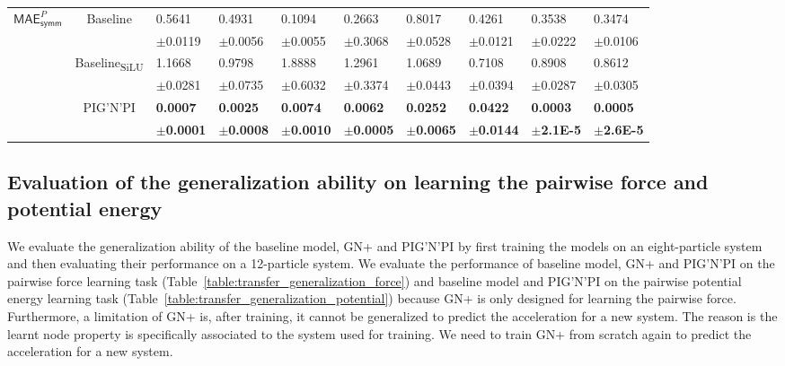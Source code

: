 \documentclass{article}
\newcommand{\pignpi}{PIG'N'PI\xspace}
\newcommand{\lemos}{GN+\xspace}
\begin{document}
\begin{table}[h!]
{\begin{tabularx}{\textwidth}{ccXXXXXXXX}
        \multirow{6}{*}{$\textsf{MAE}_\textsf{symm}^{P}$} 
        &\multirow{2}{*}{Baseline}
        & 0.5641 & 0.4931 & 0.1094 & 0.2663 & 0.8017 & 0.4261 & 0.3538 & 0.3474 \\
        &&\scriptsize$\pm$0.0119 & \scriptsize $\pm$0.0056 & \scriptsize $\pm$0.0055 & \scriptsize $\pm$0.3068 & \scriptsize $\pm$0.0528 & \scriptsize $\pm$0.0121 & \scriptsize $\pm$0.0222 & \scriptsize $\pm$0.0106\\
        \cline{3-10}\rule{0pt}{2.3ex}
        &\multirow{2}{*}{{Baseline\textsubscript{SiLU}}}
        & 1.1668 & 0.9798 & 1.8888 & 1.2961 & 1.0689 & 0.7108 & 0.8908 & 0.8612 \\
        &&\scriptsize$\pm$0.0281 & \scriptsize $\pm$0.0735 & \scriptsize $\pm$0.6032 & \scriptsize $\pm$0.3374 & \scriptsize $\pm$0.0443 & \scriptsize $\pm$0.0394 & \scriptsize $\pm$0.0287 & \scriptsize $\pm$0.0305\\
        \cline{3-10}\rule{0pt}{2.3ex}
        &\multirow{2}{*}{\pignpi}
        & \textbf{0.0007} & \textbf{0.0025} & \textbf{0.0074} & \textbf{0.0062} & \textbf{0.0252} & \textbf{0.0422} & \textbf{0.0003} & \textbf{0.0005}\\
        && \scriptsize \textbf{$\pm$0.0001} & \scriptsize \textbf{$\pm$0.0008} & \scriptsize \textbf{$\pm$0.0010} & \scriptsize \textbf{$\pm$0.0005} & \scriptsize \textbf{$\pm$0.0065} & \scriptsize \textbf{$\pm$0.0144} & \tiny \textbf{$\pm$2.1E-5} & \tiny \textbf{$\pm$2.6E-5}\\
      \bottomrule
\end{tabularx}
}
\end{table}


\clearpage

\subsection{Evaluation of the generalization ability on learning the pairwise force and potential energy}
\label{sec:genralization-test-results}

We evaluate the generalization ability of the baseline model, \lemos and \pignpi by first training the models on an eight-particle system and then evaluating their performance on a 12-particle system. 
We evaluate the performance of baseline model, \lemos and \pignpi on the pairwise force learning task (Table~\ref{table:transfer_generalization_force}) and baseline model and \pignpi on the pairwise potential energy learning task (Table~\ref{table:transfer_generalization_potential}) because \lemos is only designed for learning the pairwise force. 
Furthermore, a limitation of \lemos is, after training, it cannot be generalized to predict the acceleration for a new system. The reason is the learnt node property is specifically associated to the system used for training. We need to train \lemos from scratch again to predict the acceleration for a new system.
\end{document}
